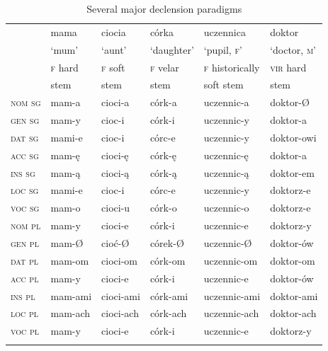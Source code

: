 \documentclass[output=paper,colorlinks,citecolor=brown]{langscibook}
\begin{document}
\begin{table}[ht]
	\centering
	\begin{tabularx}{\textwidth}{llllll}
		\lsptoprule
			& mama & ciocia & córka & uczennica & doktor \\
			& ‘mum’ & ‘aunt’ & ‘daughter’ & ‘pupil, \textsc{f}’ & ‘doctor, \textsc{m}’ \\
			\midrule
			& \textsc{f} hard & \textsc{f} soft & \textsc{f} velar & \textsc{f} historically & \textsc{vir} hard \\
			& stem & stem & stem & soft stem & stem \\
			\midrule
			\textsc{nom sg} & mam-a & cioci-a & córk-a & uczennic-a & doktor-Ø \\
			\textsc{gen sg} & mam-y & cioc-i & córk-i & uczennic-y & doktor-a \\
			\textsc{dat sg} & mami-e & cioc-i & córc-e & uczennic-y & doktor-owi \\
			\textsc{acc sg} & mam-ę & cioci-ę & córk-ę & uczennic-ę & doktor-a \\
			\textsc{ins sg} & mam-ą & cioci-ą & córk-ą & uczennic-ą & doktor-em \\
			\textsc{loc sg} & mami-e & cioc-i & córc-e & uczennic-y & doktorz-e \\
			\textsc{voc sg} & mam-o & cioci-u & córk-o & uczennic-o & doktorz-e \\
			\midrule
			\textsc{nom pl} & mam-y & cioci-e & córk-i & uczennic-e & doktorz-y \\
			\textsc{gen pl} & mam-Ø & cioć-Ø & córek-Ø & uczennic-Ø & doktor-ów \\
			\textsc{dat pl} & mam-om & cioci-om & córk-om & uczennic-om & doktor-om \\
			\textsc{acc pl} & mam-y & cioci-e & córk-i & uczennic-e & doktor-ów \\
			\textsc{ins pl} & mam-ami & cioci-ami & córk-ami & uczennic-ami & doktor-ami \\
			\textsc{loc pl} & mam-ach & cioci-ach & córk-ach & uczennic-ach & doktor-ach \\
			\textsc{voc pl} & mam-y & cioci-e & córk-i & uczennic-e & doktorz-y \\
		\lspbottomrule
	\end{tabularx}
	\caption{Several major declension paradigms}
	\label{11tab1}
\end{table}
\end{document}
